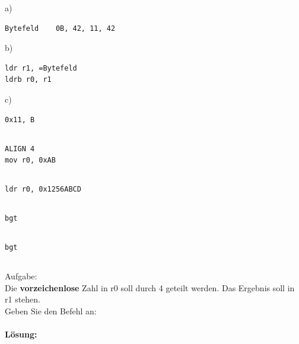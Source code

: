 \documentclass[12pt,twoside,a4paper]{article}
\begin{document}
a)
\begin{lstlisting}
Bytefeld 	0B, 42, 11, 42
\end{lstlisting}
 
b)
\begin{lstlisting}
ldr r1, =Bytefeld
ldrb r0, r1 
\end{lstlisting} 
 
c)
\begin{lstlisting}
0x11, B
\end{lstlisting} 

\subsection{}
\begin{lstlisting}
ALIGN 4
mov r0, 0xAB
\end{lstlisting} 

\subsection{}
\begin{lstlisting}
ldr r0, 0x1256ABCD
\end{lstlisting} 

\subsection{}
\begin{lstlisting}
bgt
\end{lstlisting} 

\subsection{}
\begin{lstlisting}
bgt
\end{lstlisting} 
 
\subsection{}
Aufgabe:\\
Die \textbf{vorzeichenlose} Zahl in r0 soll durch 4 geteilt werden. Das Ergebnis soll in r1 stehen.\\
Geben Sie den Befehl an:\\


\paragraph*{Lösung:}\\
\end{document}
